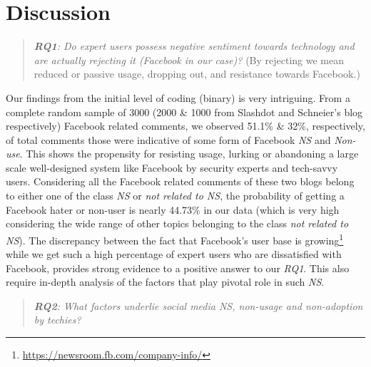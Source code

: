 \section{Discussion}
\label{sec:discussion}
\begin{quote}
\textit{\textbf{RQ1}: Do expert users possess negative sentiment towards technology and are actually rejecting it (Facebook in our case)?} (By rejecting we mean reduced or passive usage, dropping out, and resistance towards Facebook.)
\end{quote}

Our findings from the initial level of coding (binary) is very intriguing. From a complete random sample of 3000 (2000 \& 1000 from Slashdot and Schneier's blog respectively) Facebook related comments, we observed 51.1\% \& 32\%, respectively, of total comments those were indicative of some form of Facebook \textit{NS} and \emph{Non-use}. This shows the propensity for resisting usage, lurking or abandoning a large scale well-designed system like Facebook by security experts and tech-savvy users. Considering all the Facebook related comments of these two blogs belong to either one of the class \textit{NS} or \textit{not related to NS}, the probability of getting a Facebook hater or non-user is nearly 44.73\% in our data (which is very high considering the wide range of other topics belonging to the class \textit{not related to NS}). The discrepancy between the fact that Facebook's user base is growing\footnote{\url{https://newsroom.fb.com/company-info/}} \cite{lenhart2010social} while we get such a high percentage of expert users who are dissatisfied with Facebook, provides strong evidence to a positive answer to our \emph{RQ1}. This also require in-depth analysis of the factors that play pivotal role in such \textit{NS}. 

\begin{quote}
\textit{\textbf{RQ2}: What factors underlie social media \textit{NS}, non-usage and non-adoption by techies?}
\end{quote}

